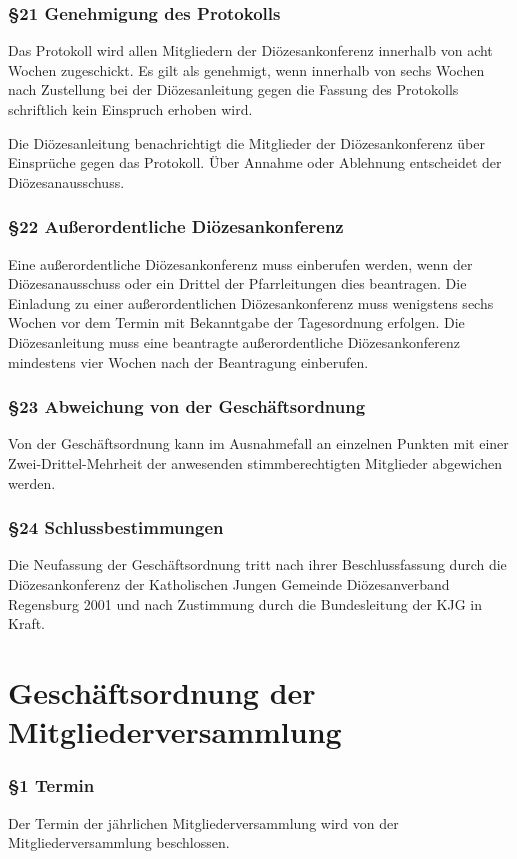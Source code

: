 \documentclass[12pt]{report}
\begin{document}
\begin{flushleft}
\subsection*{§21 Genehmigung des Protokolls}
Das Protokoll wird allen Mitgliedern der Diözesankonferenz innerhalb von acht Wochen zugeschickt. Es gilt
als genehmigt, wenn innerhalb von sechs Wochen nach Zustellung bei der Diözesanleitung gegen die Fassung
des Protokolls schriftlich kein Einspruch erhoben wird.

Die Diözesanleitung benachrichtigt die Mitglieder der Diözesankonferenz über Einsprüche gegen das Protokoll.
Über Annahme oder Ablehnung entscheidet der Diözesanausschuss.
\subsection*{§22 Außerordentliche Diözesankonferenz}
Eine außerordentliche Diözesankonferenz muss einberufen werden, wenn der Diözesanausschuss oder ein
Drittel der Pfarrleitungen dies beantragen. Die Einladung zu einer außerordentlichen Diözesankonferenz
muss wenigstens sechs Wochen vor dem Termin mit Bekanntgabe der Tagesordnung erfolgen.
Die Diözesanleitung muss eine beantragte außerordentliche Diözesankonferenz mindestens vier Wochen
nach der Beantragung einberufen.
\subsection*{§23 Abweichung von der Geschäftsordnung}
Von der Geschäftsordnung kann im Ausnahmefall an einzelnen Punkten mit einer Zwei-Drittel-Mehrheit der
anwesenden stimmberechtigten Mitglieder abgewichen werden.
\subsection*{§24 Schlussbestimmungen}
Die Neufassung der Geschäftsordnung tritt nach ihrer Beschlussfassung durch die Diözesankonferenz der
Katholischen Jungen Gemeinde Diözesanverband Regensburg 2001 und nach Zustimmung durch die Bundesleitung
der KJG in Kraft.

\chapter*{Geschäftsordnung der Mitgliederversammlung}

\subsection*{§1 Termin}
Der Termin der jährlichen Mitgliederversammlung wird von der Mitgliederversammlung beschlossen.

\end{flushleft}
\end{document}

